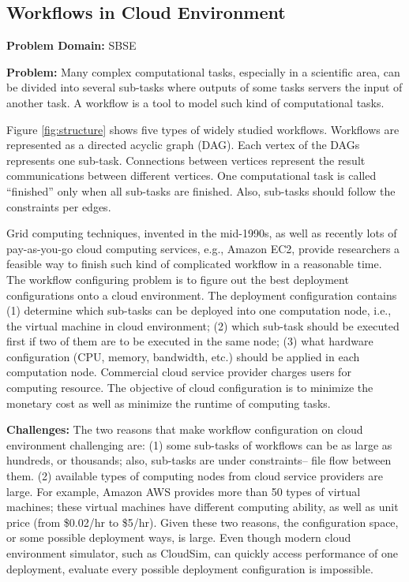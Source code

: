 \documentclass[sigconf]{acmart}
\begin{document}


    \subsection{Workflows in Cloud Environment}
\textbf{Problem Domain: } SBSE


\noindent\textbf{Problem:} Many complex computational tasks, especially in a scientific area, can be divided into several sub-tasks where outputs of some tasks servers the input of another task. A workflow is a tool to
model such kind of computational tasks.



Figure \ref{fig:structure} shows five types of widely studied workflows. Workflows are represented as a directed acyclic graph (DAG). Each vertex of the DAGs represents one sub-task. Connections between vertices represent the result communications between different vertices. One computational task is called ``finished'' only when
all sub-tasks are finished. Also, sub-tasks should follow the constraints per edges.

Grid computing techniques, invented in the mid-1990s, as well as recently lots of pay-as-you-go cloud computing services, e.g., Amazon EC2, provide researchers a feasible way to finish such kind of complicated workflow in a reasonable time.
The workflow configuring problem is to figure out the best deployment configurations onto a cloud environment. The deployment configuration
contains (1) determine which sub-tasks can be deployed into one computation node, i.e., the virtual machine in cloud environment; (2) which sub-task should be executed first if two of them are to be executed in the same node; (3) what hardware configuration (CPU, memory, bandwidth, etc.) should be applied in each computation node. Commercial cloud service provider charges users for computing resource. 
The objective of cloud configuration is to minimize the monetary cost as well as minimize the runtime of computing tasks.


\noindent\textbf{Challenges: } 
The two reasons that make workflow configuration on cloud environment challenging are: (1) some sub-tasks of workflows can be as large as hundreds, or thousands; also, sub-tasks are under constraints-- file flow between them. (2) available types of
computing nodes from cloud service providers are large.
For example, Amazon AWS provides more than 50 types of virtual machines; these
virtual machines have different computing ability, as well as unit price (from \$0.02/hr to \$5/hr).
Given these two reasons,
the configuration space, or some possible deployment ways, is large.
Even though modern cloud environment simulator, such as CloudSim, can quickly
access performance of one deployment, evaluate every
possible deployment configuration is impossible.
\end{document}
